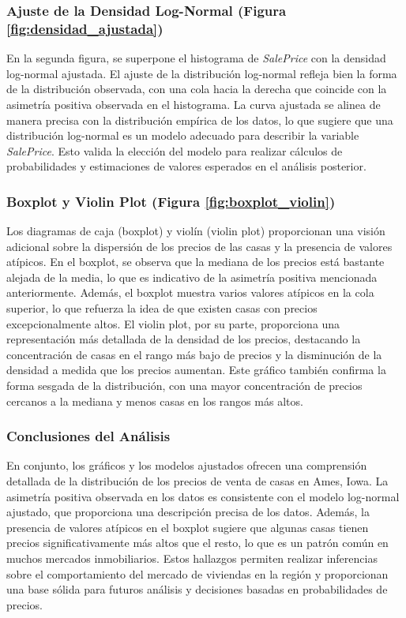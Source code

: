 \documentclass[12pt]{article}
\begin{document}
\subsubsection{Ajuste de la Densidad Log-Normal (Figura \ref{fig:densidad_ajustada})}
En la segunda figura, se superpone el histograma de \textit{SalePrice} con la densidad log-normal ajustada. El ajuste de la distribución log-normal refleja bien la forma de la distribución observada, con una cola hacia la derecha que coincide con la asimetría positiva observada en el histograma. La curva ajustada se alinea de manera precisa con la distribución empírica de los datos, lo que sugiere que una distribución log-normal es un modelo adecuado para describir la variable \textit{SalePrice}. Esto valida la elección del modelo para realizar cálculos de probabilidades y estimaciones de valores esperados en el análisis posterior.

\subsubsection{Boxplot y Violin Plot (Figura \ref{fig:boxplot_violin})}
Los diagramas de caja (boxplot) y violín (violin plot) proporcionan una visión adicional sobre la dispersión de los precios de las casas y la presencia de valores atípicos. En el boxplot, se observa que la mediana de los precios está bastante alejada de la media, lo que es indicativo de la asimetría positiva mencionada anteriormente. Además, el boxplot muestra varios valores atípicos en la cola superior, lo que refuerza la idea de que existen casas con precios excepcionalmente altos. El violin plot, por su parte, proporciona una representación más detallada de la densidad de los precios, destacando la concentración de casas en el rango más bajo de precios y la disminución de la densidad a medida que los precios aumentan. Este gráfico también confirma la forma sesgada de la distribución, con una mayor concentración de precios cercanos a la mediana y menos casas en los rangos más altos.

\subsubsection{Conclusiones del Análisis}
En conjunto, los gráficos y los modelos ajustados ofrecen una comprensión detallada de la distribución de los precios de venta de casas en Ames, Iowa. La asimetría positiva observada en los datos es consistente con el modelo log-normal ajustado, que proporciona una descripción precisa de los datos. Además, la presencia de valores atípicos en el boxplot sugiere que algunas casas tienen precios significativamente más altos que el resto, lo que es un patrón común en muchos mercados inmobiliarios. Estos hallazgos permiten realizar inferencias sobre el comportamiento del mercado de viviendas en la región y proporcionan una base sólida para futuros análisis y decisiones basadas en probabilidades de precios.
\end{document}
